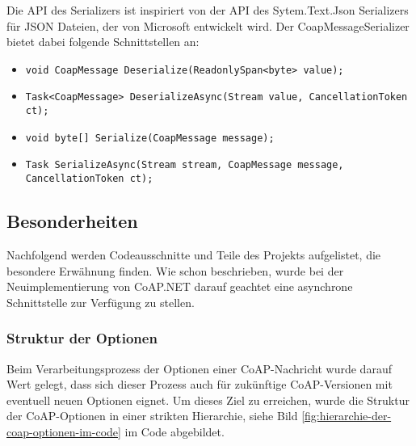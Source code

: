 Die API des Serializers ist inspiriert von der API des Sytem.Text.Json Serializers für JSON Dateien, der von Microsoft entwickelt wird. Der CoapMessageSerializer bietet dabei folgende Schnittstellen an:
\begin{itemize}
    \item \texttt{void CoapMessage Deserialize(ReadonlySpan<byte> value);}
    \item \texttt{Task<CoapMessage> DeserializeAsync(Stream value, CancellationToken ct);}
    \item \texttt{void byte[] Serialize(CoapMessage message);}
    \item \texttt{Task SerializeAsync(Stream stream, CoapMessage message, CancellationToken ct);}
\end{itemize}

\subsection{Besonderheiten}
\label{subsec:besonderheiten}

Nachfolgend werden Codeausschnitte und Teile des Projekts aufgelistet, die besondere Erwähnung finden. Wie schon beschrieben, wurde bei der Neuimplementierung von CoAP.NET darauf geachtet eine asynchrone Schnittstelle zur Verfügung zu stellen.

\subsubsection{Struktur der Optionen}
\label{subsubsec:struktur-der-optionen}

Beim Verarbeitungsprozess der Optionen einer CoAP-Nachricht wurde darauf Wert gelegt, dass sich dieser Prozess auch für zukünftige CoAP-Versionen mit eventuell neuen Optionen eignet. Um dieses Ziel zu erreichen, wurde die Struktur der CoAP-Optionen in einer strikten Hierarchie, siehe Bild \ref{fig:hierarchie-der-coap-optionen-im-code} im Code abgebildet.

